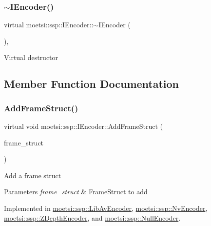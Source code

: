 \subsubsection{\texorpdfstring{$\sim$\+I\+Encoder()}{~IEncoder()}}
{\footnotesize\ttfamily virtual moetsi\+::ssp\+::\+I\+Encoder\+::$\sim$\+I\+Encoder (\begin{DoxyParamCaption}{ }\end{DoxyParamCaption})\hspace{0.3cm}{\ttfamily [inline]}, {\ttfamily [virtual]}}

Virtual destructor 

\subsection{Member Function Documentation}
\mbox{\label{classmoetsi_1_1ssp_1_1IEncoder_a8c223ec82fdd30ee8ee75157306054ec}} 
\subsubsection{\texorpdfstring{Add\+Frame\+Struct()}{AddFrameStruct()}}
{\footnotesize\ttfamily virtual void moetsi\+::ssp\+::\+I\+Encoder\+::\+Add\+Frame\+Struct (\begin{DoxyParamCaption}\item[{std\+::shared\+\_\+ptr$<$ \hyperlink{structmoetsi_1_1ssp_1_1FrameStruct}{Frame\+Struct} $>$ \&}]{frame\+\_\+struct }\end{DoxyParamCaption})\hspace{0.3cm}{\ttfamily [pure virtual]}}

Add a frame struct 
\begin{DoxyParams}{Parameters}
{\em frame\+\_\+struct} & \hyperlink{structmoetsi_1_1ssp_1_1FrameStruct}{Frame\+Struct} to add \\
\hline
\end{DoxyParams}


Implemented in \hyperlink{classmoetsi_1_1ssp_1_1LibAvEncoder_acd321dd52800b23b383b2e9489118009}{moetsi\+::ssp\+::\+Lib\+Av\+Encoder}, \hyperlink{classmoetsi_1_1ssp_1_1NvEncoder_ac3b65f82f9f4cc07ae20b7dea81fa489}{moetsi\+::ssp\+::\+Nv\+Encoder}, \hyperlink{classmoetsi_1_1ssp_1_1ZDepthEncoder_aaacd9d8c4086d615e2a0254130787404}{moetsi\+::ssp\+::\+Z\+Depth\+Encoder}, and \hyperlink{classmoetsi_1_1ssp_1_1NullEncoder_afb703c45a8d4c58f650decabb18f357b}{moetsi\+::ssp\+::\+Null\+Encoder}.

